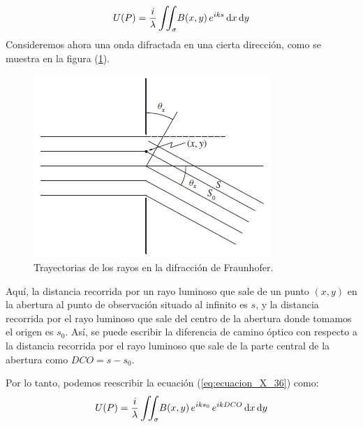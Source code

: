 \documentclass[14pt]{extarticle}
\def\scaleiint#1{\vcenter{\hbox{\scaleto[6ex]{\displaystyle\iint}{#1}}}}
\def\bs{\mkern-12mu}
\begin{document}
\begin{align}
U (P) = \dfrac{i}{\lambda} \, \scaleiint{6ex}_{\bs \sigma} B (x, y) \, e^{i k s} \dd{x} \dd{y}
\label{eq:ecuacion_X_36}
\end{align}
Consideremos ahora una onda difractada en una cierta dirección, como se muestra en la figura (\ref{fig:figura_X_16}).
\begin{figure}[H]
    \centering
    \includegraphics[scale=1]{Imagenes/Difraccion_16.png}
    \caption{Trayectorias de los rayos en la difracción de Fraunhofer.}
    \label{fig:figura_X_16}
\end{figure}
Aquí, la distancia recorrida por un rayo luminoso que sale de un punto $(x, y)$ en la abertura al punto de observación situado al infinito es $s$, y la distancia recorrida por el rayo luminoso que sale del centro de la abertura donde tomamos el origen es $s_{0}$. Así, se puede escribir la diferencia de camino óptico con respecto a la distancia recorrida por el rayo luminoso que sale de la parte central de la abertura como $DCO = s - s_{0}$.
\par 
Por lo tanto, podemos reescribir la ecuación (\ref{eq:ecuacion_X_36}) como:
\begin{align}
U (P) = \dfrac{i}{\lambda} \, \scaleiint{6ex}_{\bs \sigma} B (x, y) \, e^{i k s_{0}} \, e^{i k DCO} \dd{x} \dd{y}
\label{eq:ecuacion_X_37}
\end{align}
\end{document}
